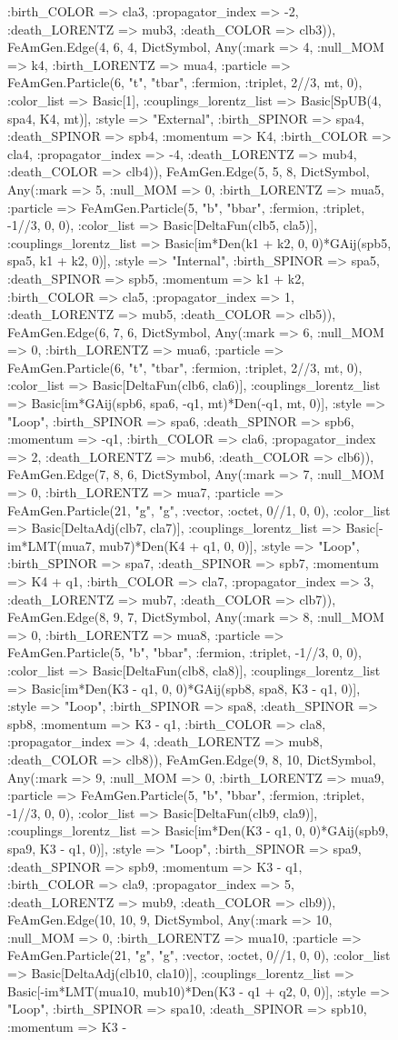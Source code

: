 \documentclass{revtex4}
\begin{document}
\begin{figure}[!htb]
\begin{center}
{:birth_COLOR => cla3, :propagator_index => -2, :death_LORENTZ => mub3, :death_COLOR => clb3)), FeAmGen.Edge(4, 6, 4, Dict{Symbol, Any}(:mark => 4, :null_MOM => k4, :birth_LORENTZ => mua4, :particle => FeAmGen.Particle(6, "t", "tbar", :fermion, :triplet, 2//3, mt, 0), :color_list => Basic[1], :couplings_lorentz_list => Basic[SpUB(4, spa4, K4, mt)], :style => "External", :birth_SPINOR => spa4, :death_SPINOR => spb4, :momentum => K4, :birth_COLOR => cla4, :propagator_index => -4, :death_LORENTZ => mub4, :death_COLOR => clb4)), FeAmGen.Edge(5, 5, 8, Dict{Symbol, Any}(:mark => 5, :null_MOM => 0, :birth_LORENTZ => mua5, :particle => FeAmGen.Particle(5, "b", "bbar", :fermion, :triplet, -1//3, 0, 0), :color_list => Basic[DeltaFun(clb5, cla5)], :couplings_lorentz_list => Basic[im*Den(k1 + k2, 0, 0)*GAij(spb5, spa5, k1 + k2, 0)], :style => "Internal", :birth_SPINOR => spa5, :death_SPINOR => spb5, :momentum => k1 + k2, :birth_COLOR => cla5, :propagator_index => 1, :death_LORENTZ => mub5, :death_COLOR => clb5)), FeAmGen.Edge(6, 7, 6, Dict{Symbol, Any}(:mark => 6, :null_MOM => 0, :birth_LORENTZ => mua6, :particle => FeAmGen.Particle(6, "t", "tbar", :fermion, :triplet, 2//3, mt, 0), :color_list => Basic[DeltaFun(clb6, cla6)], :couplings_lorentz_list => Basic[im*GAij(spb6, spa6, -q1, mt)*Den(-q1, mt, 0)], :style => "Loop", :birth_SPINOR => spa6, :death_SPINOR => spb6, :momentum => -q1, :birth_COLOR => cla6, :propagator_index => 2, :death_LORENTZ => mub6, :death_COLOR => clb6)), FeAmGen.Edge(7, 8, 6, Dict{Symbol, Any}(:mark => 7, :null_MOM => 0, :birth_LORENTZ => mua7, :particle => FeAmGen.Particle(21, "g", "g", :vector, :octet, 0//1, 0, 0), :color_list => Basic[DeltaAdj(clb7, cla7)], :couplings_lorentz_list => Basic[-im*LMT(mua7, mub7)*Den(K4 + q1, 0, 0)], :style => "Loop", :birth_SPINOR => spa7, :death_SPINOR => spb7, :momentum => K4 + q1, :birth_COLOR => cla7, :propagator_index => 3, :death_LORENTZ => mub7, :death_COLOR => clb7)), FeAmGen.Edge(8, 9, 7, Dict{Symbol, Any}(:mark => 8, :null_MOM => 0, :birth_LORENTZ => mua8, :particle => FeAmGen.Particle(5, "b", "bbar", :fermion, :triplet, -1//3, 0, 0), :color_list => Basic[DeltaFun(clb8, cla8)], :couplings_lorentz_list => Basic[im*Den(K3 - q1, 0, 0)*GAij(spb8, spa8, K3 - q1, 0)], :style => "Loop", :birth_SPINOR => spa8, :death_SPINOR => spb8, :momentum => K3 - q1, :birth_COLOR => cla8, :propagator_index => 4, :death_LORENTZ => mub8, :death_COLOR => clb8)), FeAmGen.Edge(9, 8, 10, Dict{Symbol, Any}(:mark => 9, :null_MOM => 0, :birth_LORENTZ => mua9, :particle => FeAmGen.Particle(5, "b", "bbar", :fermion, :triplet, -1//3, 0, 0), :color_list => Basic[DeltaFun(clb9, cla9)], :couplings_lorentz_list => Basic[im*Den(K3 - q1, 0, 0)*GAij(spb9, spa9, K3 - q1, 0)], :style => "Loop", :birth_SPINOR => spa9, :death_SPINOR => spb9, :momentum => K3 - q1, :birth_COLOR => cla9, :propagator_index => 5, :death_LORENTZ => mub9, :death_COLOR => clb9)), FeAmGen.Edge(10, 10, 9, Dict{Symbol, Any}(:mark => 10, :null_MOM => 0, :birth_LORENTZ => mua10, :particle => FeAmGen.Particle(21, "g", "g", :vector, :octet, 0//1, 0, 0), :color_list => Basic[DeltaAdj(clb10, cla10)], :couplings_lorentz_list => Basic[-im*LMT(mua10, mub10)*Den(K3 - q1 + q2, 0, 0)], :style => "Loop", :birth_SPINOR => spa10, :death_SPINOR => spb10, :momentum => K3 - }
\end{center}
\end{figure}
\end{document}
